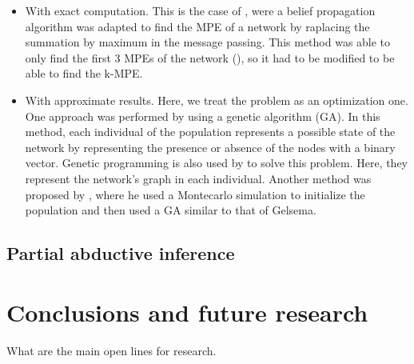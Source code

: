 \documentclass[a4paper,11pt]{article}
\begin{document}
\begin{itemize}
\item With exact computation. This is the case of \cite{dawid1992}, were a belief propagation algorithm was adapted to find the MPE of a network by raplacing the summation by maximum in the message passing. This method was able to only find the first 3 MPEs of the network (\cite{nilsson1998}), so it had to be modified to be able to find the k-MPE.

\item With approximate results. Here, we treat the problem as an optimization one. One approach was performed by \cite{gelsema1995} using a genetic algorithm (GA). In this method, each individual of the population represents a possible state of the network by representing the presence or absence of the nodes with a binary vector. Genetic programming is also used by \cite{rojas1993} to solve this problem. Here, they represent the network's graph in each individual. Another method was proposed by \cite{welch1996}, where he used a Montecarlo simulation to initialize the population and then used a GA similar to that of Gelsema.
\end{itemize}

\subsection{Partial abductive inference}



\section{Conclusions and future research}

What are the main open lines for research.
\end{document}
